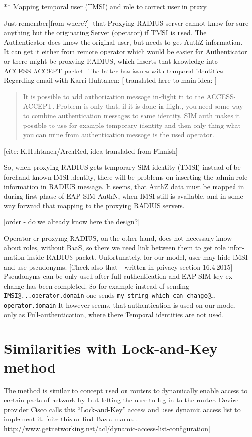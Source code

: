 \documentclass[12pt,a4paper,english]{tutthesis}
\begin{document}
\begin{otherlanguage}{english}
** Mapping temporal user (TMSI) and role to correct user in proxy

Just remember[from where?], that Proxying RADIUS server cannot know
for sure anything but the originating Server (operator) if TMSI is
used. The Authenticator does know the original user, but needs to get
AuthZ information. It can get it either from remote operator which
would be easier for Authenticator or there might be proxying RADIUS,
which inserts that knowledge into ACCESS-ACCEPT packet. The latter has
issues with temporal identities.  Regarding email with Karri Huhtanen:
[ translated here to main idea: ]

\begin{quote}
It is possible to add authorization message in-flight in to the
ACCESS-ACCEPT.
Problem is only that, if it is done in flight, you need some way to
combine authentication messages to same identity. SIM auth makes it
possible to use for example temporary identity and then only thing
what you can mine from authentication message is the used operator.
\end{quote}
[cite: K.Huhtanen/ArchRed, idea translated from Finnish]




So, when proxying RADIUS gets temporary SIM-identity (TMSI) instead of
beforehand known IMSI identity, there will be problems on inserting
the admin role information in RADIUS message.
It seems, that AuthZ data must be mapped in during first phase of
EAP-SIM AuthN, when IMSI still is available, and in some way forward
that mapping to the proxying RADIUS servers.

[order - do we already know here the design?]

Operator or proxying RADIUS, on the other hand, does not necessary
know about roles, without BaaS, so there we need link between them to
get role information inside RADIUS packet.
Unfortunately, for our model, user may  hide IMSI and use
pseudonyms. [Check also that - written in privacy section 16.4.2015]
Pseudonyms can be only used after full-authentication and
EAP-SIM key exchange has been completed. 
So for example instead of sending 
\texttt{IMSI@...operator.domain}
one sends  \texttt{my-string-which-can-change@…operator.domain}
 It however seems, that authentication is used on our model only as
Full-authentication, where there Temporal identities are not used.

\section{Similarities with Lock-and-Key method}
\label{sec-4-8}
The method is similar to concept used on routers to dynamically enable
access to certain parts of network by first letting the user to log in
to the router.  
Device provider Cisco calls this ``Lock-and-Key'' access
and uses dynamic access list to implement it.
[cite this or find Basic manual: \url{http://www.getnetworking.net/acl/dynamic-access-list-configuration}]


\end{otherlanguage}
\end{document}
